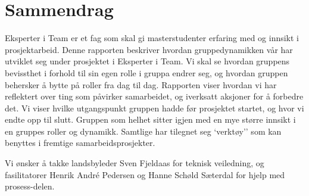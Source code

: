 \chapter*{Sammendrag}
Eksperter i Team er et fag som skal gi masterstudenter erfaring med og innsikt i prosjektarbeid.
Denne rapporten beskriver hvordan gruppedynamikken vår har utviklet seg under prosjektet i Eksperter i Team.
Vi skal se hvordan gruppens bevissthet i forhold til sin egen rolle i gruppa endrer seg, og hvordan gruppen behersker å bytte på roller fra dag til dag.
Rapporten viser hvordan vi har reflektert over ting som påvirker samarbeidet, og iverksatt aksjoner for å forbedre det. 
Vi viser hvilke utgangspunkt gruppen hadde før prosjektet startet, og hvor vi endte opp til slutt. 
Gruppen som helhet sitter igjen med en mye større innsikt i en gruppes roller og dynamikk. Samtlige har tilegnet seg `verktøy'' som kan benyttes i fremtige samarbeidsprosjekter. 

Vi ønsker å takke landsbyleder Sven Fjeldaas for teknisk veiledning, og fasilitatorer Henrik André Pedersen og Hanne Schøld Sæterdal for hjelp med prosess-delen.
